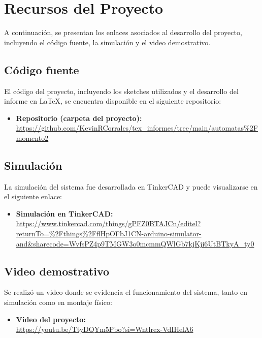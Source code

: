 \documentclass[conference]{IEEEtran}
\begin{document}
\section{Recursos del Proyecto}

A continuación, se presentan los enlaces asociados al desarrollo del proyecto, incluyendo 
el código fuente, la simulación y el video demostrativo.

\subsection{Código fuente}
El código del proyecto, incluyendo los sketches utilizados y el desarrollo del informe en LaTeX, 
se encuentra disponible en el siguiente repositorio:

\begin{itemize}
    \item \textbf{Repositorio (carpeta del proyecto):} \\
    \url{https://github.com/KevinRCorrales/tex_informes/tree/main/automatas%2Fmomento2}
\end{itemize}

\subsection{Simulación}
La simulación del sistema fue desarrollada en TinkerCAD y puede visualizarse en el siguiente enlace:

\begin{itemize}
    \item \textbf{Simulación en TinkerCAD:} \\
    \url{https://www.tinkercad.com/things/gPFZ0BTAJCn/editel?returnTo=%2Fthings%2FflHpOFbJ1CN-arduino-simulator-and&sharecode=WvfsPZ4p9TMGW3o0mcmmQWlGb7kjKji6UtBTkyA_ty0}
\end{itemize}

\subsection{Video demostrativo}
Se realizó un video donde se evidencia el funcionamiento del sistema, tanto en simulación como en montaje físico:

\begin{itemize}
    \item \textbf{Video del proyecto:} \\
    \url{https://youtu.be/TtyDQYm5Pbo?si=Wntlrex-VdIHelA6}
\end{itemize}
\end{document}
